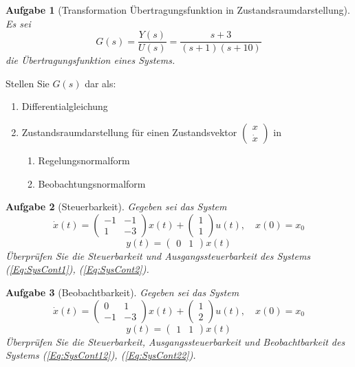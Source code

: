 \documentclass[11pt,a4paper,headsepline]{scrartcl}
\newtheorem{aufgabe}{Aufgabe}
\begin{document}
\vspace{0.5cm}
\begin{aufgabe}[Transformation \"Ubertragungsfunktion in Zustandsraumdarstellung]
Es sei \[G(s) = \frac{Y(s)}{U(s)} = \frac{s+3}{(s+1)(s+10)}\] die \"Ubertragungsfunktion eines Systems.
\end{aufgabe}
Stellen Sie $G(s)$ dar als:
\begin{enumerate}
		\item Differentialgleichung
		\item Zustandsraumdarstellung f\"ur einen Zustandsvektor $\begin{pmatrix} x \\ \dot{x} \end{pmatrix}$ in
		\begin{enumerate}
		\item Regelungsnormalform
		\item Beobachtungsnormalform
		\end{enumerate}
		\end{enumerate}
\vspace{0.5cm}
\begin{aufgabe}[Steuerbarkeit]
Gegeben sei das System
\begin{equation}
\label{Eq:SysCont1}
\dot{x}(t) = 
\begin{pmatrix}
 -1 & -1 \\ 1 & -3
\end{pmatrix} x(t) + 
\begin{pmatrix}
 1 \\ 1
\end{pmatrix} u(t), \quad x(0) = x_{0}
\end{equation}
\begin{equation}
\label{Eq:SysCont2}
y(t) = \begin{pmatrix}
 0 & 1
\end{pmatrix} x(t)
\end{equation}
\"Uberpr\"ufen Sie die Steuerbarkeit und Ausgangssteuerbarkeit des Systems (\ref{Eq:SysCont1}), (\ref{Eq:SysCont2}).

\end{aufgabe}

\vspace{0.5cm}
\begin{aufgabe}[Beobachtbarkeit]
Gegeben sei das System
\begin{equation}
\label{Eq:SysCont12}
\dot{x}(t) = 
\begin{pmatrix}
 0 & 1 \\ -1 & -3
\end{pmatrix} x(t) + 
\begin{pmatrix}
 1 \\ 2
\end{pmatrix} u(t), \quad x(0) = x_{0}
\end{equation}
\begin{equation}
\label{Eq:SysCont22}
y(t) = 
\begin{pmatrix}
1 & 1 
\end{pmatrix}
x(t)
\end{equation}
\"Uberpr\"ufen Sie die Steuerbarkeit, Ausgangssteuerbarkeit und Beobachtbarkeit des Systems (\ref{Eq:SysCont12}), (\ref{Eq:SysCont22}).
\end{aufgabe}
\end{document}
